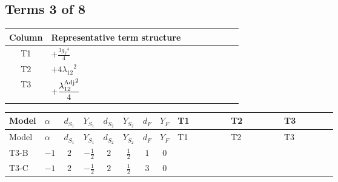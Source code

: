 \documentclass[8pt]{article}
\begin{document}
\begin{landscape}
\subsection*{Terms 3 of 8}
\begin{center}
\begin{tabular}{@{}c >{\raggedright\arraybackslash}p{0.82\linewidth}@{}}
\toprule
Column & Representative term structure \\
\midrule
T1 & \(\displaystyle +\frac{3 {g_Y}^4}{4}\) \\
\midrule
T2 & \(\displaystyle +4 {\lambda_{12}}^2\) \\
\midrule
T3 & \(\displaystyle +\frac{{\lambda_{12}^{\rm Adj}}^2}{4}\) \\
\midrule
\bottomrule
\end{tabular}
\end{center}
\smallskip
\tiny
\begin{longtable}{@{}llcccccc >{\raggedright\arraybackslash}p{0.21\linewidth} >{\raggedright\arraybackslash}p{0.21\linewidth} >{\raggedright\arraybackslash}p{0.21\linewidth}@{}}
\toprule
Model & $\alpha$ & $d_{S_1}$ & $Y_{S_1}$ & $d_{S_2}$ & $Y_{S_2}$ & $d_F$ & $Y_F$ & T1 & T2 & T3 \\
\midrule
\endfirsthead
\toprule
Model & $\alpha$ & $d_{S_1}$ & $Y_{S_1}$ & $d_{S_2}$ & $Y_{S_2}$ & $d_F$ & $Y_F$ & T1 & T2 & T3 \\
\midrule
\endhead
T3-B & $-1$ & $2$ & $-\frac{1}{2}$ & $2$ & $\frac{1}{2}$ & $1$ & $0$ & \scriptsize\adjustbox{max width=\linewidth}{$\begin{gathered} +\frac{3 {g_Y}^4}{4}\end{gathered}$} & \scriptsize\adjustbox{max width=\linewidth}{$\begin{gathered} +4 {\lambda_{12}}^2\end{gathered}$} & \scriptsize\adjustbox{max width=\linewidth}{$\begin{gathered} +\frac{{\lambda_{12}^{\rm Adj}}^2}{4}\end{gathered}$} \\
\midrule
T3-C & $-1$ & $2$ & $-\frac{1}{2}$ & $2$ & $\frac{1}{2}$ & $3$ & $0$ & \scriptsize\adjustbox{max width=\linewidth}{$\begin{gathered} +\frac{3 {g_Y}^4}{4}\end{gathered}$} & \scriptsize\adjustbox{max width=\linewidth}{$\begin{gathered} +4 {\lambda_{12}}^2\end{gathered}$} & \scriptsize\adjustbox{max width=\linewidth}{$\begin{gathered} +\frac{{\lambda_{12}^{\rm Adj}}^2}{4}\end{gathered}$} \\

\end{longtable}
\end{landscape}
\end{document}
